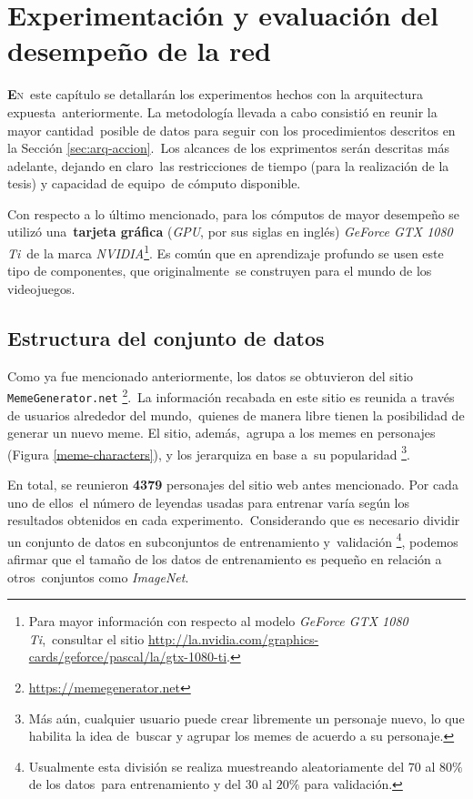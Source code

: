 \chapter{Experimentación y evaluación del desempeño de la red}

\noindent
\lettrine[lines=2, lhang=0.33, loversize=0.25]{\textbf{E}}{n}\
este capítulo se detallarán los experimentos hechos con la arquitectura expuesta\
anteriormente. La metodología llevada a cabo consistió en reunir la mayor cantidad\
posible de datos para seguir con los procedimientos descritos en la Sección \ref{sec:arq-accion}.\
Los alcances de los exprimentos serán descritas más adelante, dejando en claro\
las restricciones de tiempo (para la realización de la tesis) y capacidad de equipo\
de cómputo disponible.\par
Con respecto a lo último mencionado, para los cómputos de mayor desempeño se utilizó una\
\textbf{tarjeta gráfica} (\emph{GPU}, por sus siglas en inglés) \emph{GeForce GTX 1080 Ti}\
de la marca \emph{NVIDIA}\footnote{
  Para mayor información con respecto al modelo \emph{GeForce GTX 1080 Ti},\
  consultar el sitio \url{http://la.nvidia.com/graphics-cards/geforce/pascal/la/gtx-1080-ti}.
}. Es común que en aprendizaje profundo se usen este tipo de componentes, que originalmente\
se construyen para el mundo de los videojuegos.

\section{Estructura del conjunto de datos} \label{sec:dataset}

\noindent
Como ya fue mencionado anteriormente, los datos se obtuvieron del sitio \verb+MemeGenerator.net+%
\footnote{\url{https://memegenerator.net}}.\
La información recabada en este sitio es reunida a través de usuarios alrededor del mundo,\
quienes de manera libre tienen la posibilidad de generar un nuevo meme. El sitio, además,\
agrupa a los memes en personajes (Figura \ref{meme-characters}), y los jerarquiza en base a\
su popularidad%
\footnote{
  Más aún, cualquier usuario puede crear libremente un personaje nuevo, lo que habilita la idea de\
  buscar y agrupar los memes de acuerdo a su personaje.
}.\par
En total, se reunieron \textbf{4379} personajes del sitio web antes mencionado. Por cada uno de ellos\
el número de leyendas usadas para entrenar varía según los resultados obtenidos en cada experimento.\
Considerando que es necesario dividir un conjunto de datos en subconjuntos de entrenamiento y\
validación%
\footnote{
  Usualmente esta división se realiza muestreando aleatoriamente del $70$ al $80\%$ de los datos\
  para entrenamiento y del $30$ al $20\%$ para validación.
}, podemos afirmar que el tamaño de los datos de entrenamiento es pequeño en relación a otros\
conjuntos como \emph{ImageNet}.

